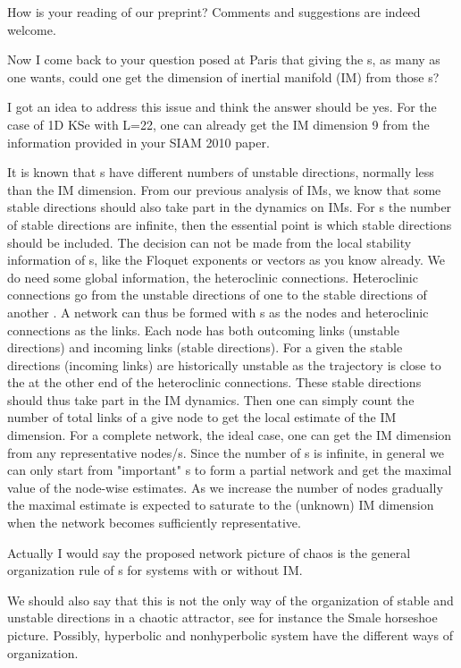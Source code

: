 \begin{description}
  How is your reading of our preprint? Comments and suggestions are indeed welcome.

  Now I come back to your question posed at Paris that giving the \po s, as
  many as one wants, could one get the dimension of inertial manifold (IM)
  from those \po s?

  I got an idea to address this issue and think the answer should be yes.
  For the case of 1D KSe with L=22, one can already get the IM dimension 9
  from the information provided in your SIAM 2010 paper.

  It is known that \po s have different numbers of unstable directions,
  normally less than the IM dimension. From our previous {\cLv} analysis of
  IMs, we know that some stable directions should also take part in the
  dynamics on IMs. For \po s the number of stable directions are infinite,
  then the essential point is which stable directions should be included.
  The decision can not be made from the local stability information of \po
  s, like the Floquet exponents or vectors as you know already. We do need
  some global information, the heteroclinic connections. Heteroclinic
  connections go from the unstable directions of one \po  to the stable
  directions of another \po. A network can thus be formed with \po s as the
  nodes and heteroclinic connections as the links. Each node has both
  outcoming links (unstable directions) and incoming links (stable
  directions). For a given \po  the stable directions (incoming links) are
  historically unstable as the trajectory is close to the \po  at the other
  end of the heteroclinic connections. These stable directions should thus
  take part in the IM dynamics. Then one can simply count the number of
  total links of a give node to get the local estimate of the IM dimension.
  For a complete network, the ideal case, one can get the IM dimension from
  any representative nodes/\po s. Since the number of \po s is infinite, in
  general we can only start from "important" \po s to form a partial
  network and get the maximal value of the node-wise estimates. As we
  increase the number of nodes gradually the maximal estimate is expected
  to saturate to the (unknown) IM dimension when the network becomes
  sufficiently representative.

  Actually I would say the proposed network picture of chaos is the general
  organization rule of \po s for systems with or without IM.

  We should also say that this is not the only way of the organization of
  stable and unstable directions in a chaotic attractor, see for instance
  the Smale horseshoe picture. Possibly, hyperbolic and nonhyperbolic
  system have the different ways of organization.


\end{description}

